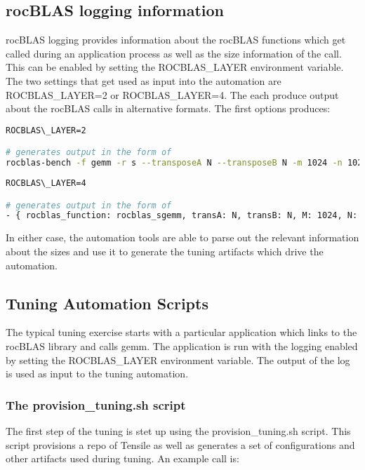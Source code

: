 \documentclass[]{article}
\begin{document}
\subsection{rocBLAS logging information}

rocBLAS logging provides information about the rocBLAS functions which get called during an application process as well as the size information of the call. This can be enabled by setting the ROCBLAS\_LAYER environment variable. The two settings that get used as input into the automation are ROCBLAS\_LAYER=2 or ROCBLAS\_LAYER=4. The each produce output about the rocBLAS calls in alternative formats. The first options produces:

\begin{lstlisting}[language=bash,breaklines=true]
ROCBLAS\_LAYER=2

# generates output in the form of
rocblas-bench -f gemm -r s --transposeA N --transposeB N -m 1024 -n 1024 -k 1024 --beta 0.0 --alpha 1.0 --lda 1024 --ldb 1024 --ldc 1024 
\end{lstlisting}

\begin{lstlisting}[language=bash,breaklines=true]
ROCBLAS\_LAYER=4

# generates output in the form of
- { rocblas_function: rocblas_sgemm, transA: N, transB: N, M: 1024, N: 1024, K: 1024, lda: 1024, ldb: 1024, ldc: 1024}
\end{lstlisting}

In either case, the automation tools are able to parse out the relevant information about the sizes and use it to generate the tuning artifacts which drive the automation.

\subsection{Tuning Automation Scripts}

The typical tuning exercise starts with a particular application which links to the rocBLAS library and calls gemm. The application is run with the logging enabled by setting the ROCBLAS\_LAYER environment variable. The output of the log is used as input to the tuning automation. 

\subsubsection{The provision\_tuning.sh script}

The first step of the tuning is stet up using the provision\_tuning.sh script. This script provisions a repo of Tensile as well as generates a set of configurations and other artifacts used during tuning. An example call is:
\end{document}
